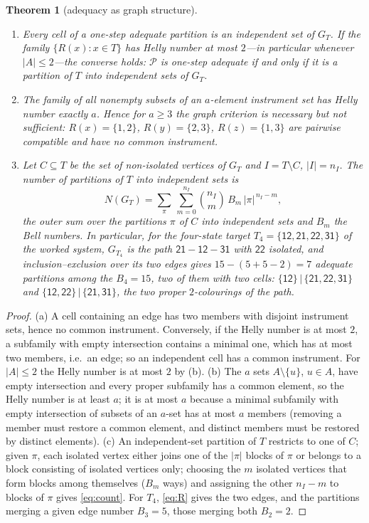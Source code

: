 \documentclass[11pt,a4paper]{article}
\theoremstyle{plain}
\newtheorem{theorem}{Theorem}[section]
\theoremstyle{definition}
\theoremstyle{remark}
\newcommand{\calP}{\mathcal{P}}
\newcommand{\st}[1]{\mathsf{#1}}
\begin{document}
\begin{theorem}[adequacy as graph structure]\label{thm:adequacy}
\begin{enumerate}[label=(\alph*),leftmargin=2em,itemsep=1pt]
\item Every cell of a one-step adequate partition is an independent set of $G_T$. If the family $\{R(x):x\in T\}$ has Helly number at most $2$---in particular whenever $|A|\le 2$---the converse holds: $\calP$ is one-step adequate if and only if it is a partition of $T$ into independent sets of $G_T$.
\item The family of all nonempty subsets of an $a$-element instrument set has Helly number exactly $a$. Hence for $a\ge 3$ the graph criterion is necessary but not sufficient: $R(x)=\{1,2\}$, $R(y)=\{2,3\}$, $R(z)=\{1,3\}$ are pairwise compatible and have no common instrument.
\item Let $C\subseteq T$ be the set of non-isolated vertices of $G_T$ and $I=T\setminus C$, $|I|=n_I$. The number of partitions of $T$ into independent sets is
\begin{equation}\label{eq:count}
N(G_T)=\sum_{\pi}\ \sum_{m=0}^{n_I}\binom{n_I}{m}\,B_m\,|\pi|^{\,n_I-m},
\end{equation}
the outer sum over the partitions $\pi$ of $C$ into independent sets and $B_m$ the Bell numbers. In particular, for the four-state target $T_4=\{\st{12},\st{21},\st{22},\st{31}\}$ of the worked system, $G_{T_4}$ is the path $\st{21}-\st{12}-\st{31}$ with $\st{22}$ isolated, and inclusion--exclusion over its two edges gives $15-(5+5-2)=7$ adequate partitions among the $B_4=15$, two of them with two cells: $\{\st{12}\}\,|\,\{\st{21},\st{22},\st{31}\}$ and $\{\st{12},\st{22}\}\,|\,\{\st{21},\st{31}\}$, the two proper $2$-colourings of the path.
\end{enumerate}
\end{theorem}

\begin{proof}
(a) A cell containing an edge has two members with disjoint instrument sets, hence no common instrument. Conversely, if the Helly number is at most $2$, a subfamily with empty intersection contains a minimal one, which has at most two members, i.e.\ an edge; so an independent cell has a common instrument. For $|A|\le 2$ the Helly number is at most $2$ by (b). (b) The $a$ sets $A\setminus\{u\}$, $u\in A$, have empty intersection and every proper subfamily has a common element, so the Helly number is at least $a$; it is at most $a$ because a minimal subfamily with empty intersection of subsets of an $a$-set has at most $a$ members (removing a member must restore a common element, and distinct members must be restored by distinct elements). (c) An independent-set partition of $T$ restricts to one of $C$; given $\pi$, each isolated vertex either joins one of the $|\pi|$ blocks of $\pi$ or belongs to a block consisting of isolated vertices only; choosing the $m$ isolated vertices that form blocks among themselves ($B_m$ ways) and assigning the other $n_I-m$ to blocks of $\pi$ gives \eqref{eq:count}. For $T_4$, \eqref{eq:R} gives the two edges, and the partitions merging a given edge number $B_3=5$, those merging both $B_2=2$.
\end{proof}
\end{document}
